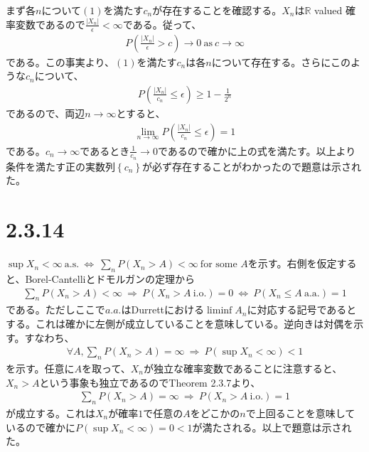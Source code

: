 \documentclass{article}
\begin{document}
まず各$n$について$(1)$を満たす$c_n$が存在することを確認する。$X_n$は$\mathbb{R}$ valued 確率変数であるので$\frac{|X_n|}{\epsilon} < \infty$である。従って、
\begin{align*}
	P\left( \frac{|X_n|}{\epsilon} > c \right)\to 0\ \text{as}\ c\to \infty
\end{align*}
である。この事実より、$(1)$を満たす$c_n$は各$n$について存在する。さらにこのような$c_n$について、
\begin{align*}
	P\left( \frac{|X_n|}{c_n} \leq \epsilon \right) \geq 1-\frac{1}{2^n}
\end{align*}
であるので、両辺$n\to \infty$とすると、
\begin{align*}
	\lim_{n\to \infty} P\left( \frac{|X_n|}{c_n} \leq \epsilon \right)= 1
\end{align*}
である。$c_n \to \infty$であるとき$\frac{1}{c_n} \to 0$であるので確かに上の式を満たす。以上より条件を満たす正の実数列$\left\{ c_n \right\}$が必ず存在することがわかったので題意は示された。

\section{2.3.14}
$\sup X_n < \infty\ \text{a.s.}\ \Leftrightarrow\ \sum_n P\left( X_n > A \right) < \infty\ \text{for some $A$}$を示す。右側を仮定すると、Borel-Cantelliとドモルガンの定理から
\begin{align*}
	\sum_n P\left( X_n > A \right) < \infty\ \Rightarrow\ P\left( X_n > A\ \text{i.o.} \right) = 0\ \Leftrightarrow\ P\left( X_n \leq A\ \text{a.a.} \right) = 1
\end{align*}
である。ただしここで$a.a.$はDurrettにおける$\liminf A_n$に対応する記号であるとする。これは確かに左側が成立していることを意味している。逆向きは対偶を示す。すなわち、
\begin{align*}
	\forall A, \sum_n P\left( X_n > A \right) = \infty\ \Rightarrow\ P\left( \sup X_n < \infty \right) < 1
\end{align*}
を示す。任意に$A$を取って、$X_n$が独立な確率変数であることに注意すると、$X_n > A$という事象も独立であるのでTheorem 2.3.7より、
\begin{align*}
	\sum_n P\left( X_n > A \right) = \infty\ \Rightarrow\ P\left( X_n > A\ \text{i.o.} \right) = 1
\end{align*}
が成立する。これは$X_n$が確率$1$で任意の$A$をどこかの$n$で上回ることを意味しているので確かに$P\left( \sup X_n < \infty \right) = 0 < 1$が満たされる。以上で題意は示された。
\end{document}
